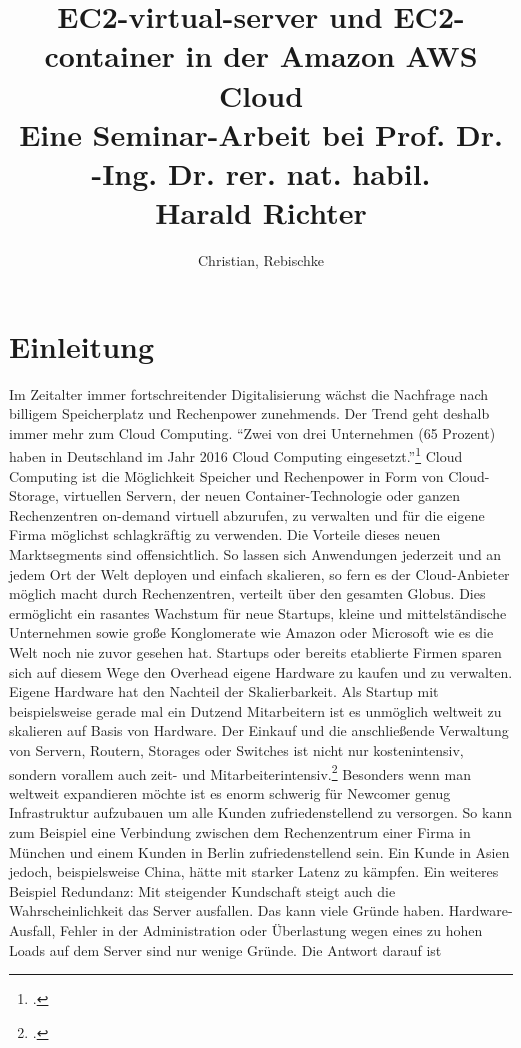 \documentclass[titlepage]{report}
\title{EC2-virtual-server und EC2-container in der Amazon AWS Cloud \\
\small Eine Seminar-Arbeit bei Prof. Dr. -Ing. Dr. rer. nat. habil. \\
Harald Richter}
\author{Christian, Rebischke}
\begin{document}
\maketitle
\tableofcontents
\chapter*{Einleitung}
Im Zeitalter immer fortschreitender Digitalisierung wächst die Nachfrage
nach billigem Speicherplatz und Rechenpower zunehmends. Der Trend geht
deshalb immer mehr zum Cloud Computing.  ``Zwei von drei Unternehmen (65
Prozent) haben in Deutschland im Jahr 2016 Cloud Computing
eingesetzt.''\footcite{SWG17} Cloud Computing ist die Möglichkeit
Speicher und Rechenpower in Form von Cloud-Storage, virtuellen Servern,
der neuen Container-Technologie oder ganzen Rechenzentren on-demand
virtuell abzurufen, zu verwalten und für die eigene Firma möglichst
schlagkräftig zu verwenden. Die Vorteile dieses neuen Marktsegments sind
offensichtlich. So lassen sich Anwendungen jederzeit und an jedem Ort
der Welt deployen und einfach skalieren, so fern es der Cloud-Anbieter
möglich macht durch Rechenzentren, verteilt über den gesamten Globus.
Dies ermöglicht ein rasantes Wachstum für neue Startups, kleine und
mittelständische Unternehmen sowie große Konglomerate wie Amazon oder
Microsoft wie es die Welt noch nie zuvor gesehen hat. Startups oder
bereits etablierte Firmen sparen sich auf diesem Wege den Overhead
eigene Hardware zu kaufen und zu verwalten.  Eigene Hardware hat den
Nachteil der Skalierbarkeit. Als Startup mit beispielsweise gerade mal
ein Dutzend Mitarbeitern ist es unmöglich weltweit zu skalieren auf
Basis von Hardware. Der Einkauf und die anschließende Verwaltung von
Servern, Routern, Storages oder Switches ist nicht nur kostenintensiv,
sondern vorallem auch zeit- und Mitarbeiterintensiv.\footcite[S.
1]{RZ17} Besonders wenn man weltweit expandieren möchte ist es enorm
schwerig für Newcomer genug Infrastruktur aufzubauen um alle Kunden
zufriedenstellend zu versorgen.  So kann zum Beispiel eine Verbindung
zwischen dem Rechenzentrum einer Firma in München und einem Kunden in
Berlin zufriedenstellend sein. Ein Kunde in Asien jedoch, beispielsweise
China, hätte mit starker Latenz zu kämpfen. Ein weiteres Beispiel
Redundanz: Mit steigender Kundschaft steigt auch die Wahrscheinlichkeit
das Server ausfallen. Das kann viele Gründe haben. Hardware-Ausfall,
Fehler in der Administration oder Überlastung wegen eines zu hohen Loads
auf dem Server sind nur wenige Gründe. Die Antwort darauf ist
\end{document}
